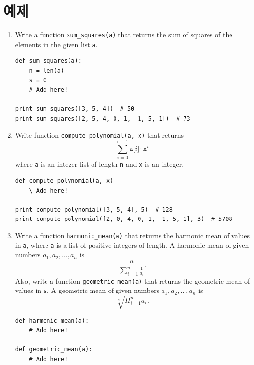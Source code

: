 \documentclass[../main.tex]{subfiles}
\begin{document}
\section{예제}
\begin{enumerate}
\item Write a function \texttt{sum\_squares(a)} that returns the sum of squares of the elements in the given list \texttt{a}.
\begin{verbatim}
def sum_squares(a):
    n = len(a)
    s = 0
    # Add here!

print sum_squares([3, 5, 4])  # 50
print sum_squares([2, 5, 4, 0, 1, -1, 5, 1])  # 73
\end{verbatim}

\item Write function \texttt{compute\_polynomial(a, x)} that returns
\[
\sum_{i = 0}^{\texttt{n} - 1} \texttt{a[}i\texttt{]} \cdot \texttt{x}^i
\]
where \texttt{a} is an integer list of length \texttt{n} and \texttt{x} is an integer.
\begin{verbatim}
def compute_polynomial(a, x):
    \ Add here!

print compute_polynomial([3, 5, 4], 5)  # 128
print compute_polynomial([2, 0, 4, 0, 1, -1, 5, 1], 3)  # 5708
\end{verbatim}

\item Write a function \texttt{harmonic\_mean(a)} that returns the harmonic mean of values in \texttt{a}, where \texttt{a} is a list of positive integers of length.
A harmonic mean of given numbers $a_1, a_2, \dots, a_n$ is
\[
\frac{n}{\sum_{i = 1}^{n} \frac{1}{a_i}}.
\]
Also, write a function \texttt{geometric\_mean(a)} that returns the geometric mean of values in \texttt{a}.
A geometric mean of given numbers $a_1, a_2, \dots, a_n$ is
\[
\sqrt[n]{\Pi_{i = 1}^{n} a_i}.
\]

\begin{verbatim}
def harmonic_mean(a):
    # Add here!

def geometric_mean(a):
    # Add here!


\end{verbatim}
\end{enumerate}
\end{document}
